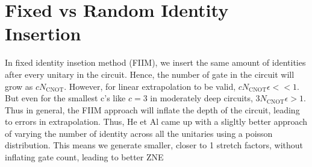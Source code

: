 \section{Fixed vs Random Identity Insertion} \label{sec:develop}
In fixed identity insetion method (FIIM), we insert the same amount of identities after every unitary in the circuit. Hence, the number of gate in the circuit will grow as \(cN_\text{CNOT}\). However, for linear extrapolation to be valid, \(cN_\text{CNOT}\epsilon <<1\). But even for the smallest c's like \(c = 3\) in moderately deep circuits, \(3N_\text{CNOT}\epsilon >1\). Thus in general, the FIIM approach will inflate the depth of the circuit, leading to errors in extrapolation.
Thus, He et Al came up with a sligltly better approach of varying the number of identity across all the unitaries using a poisson distribution. This means
we generate smaller, closer to 1 stretch factors, without inflating gate count,
leading to better ZNE
